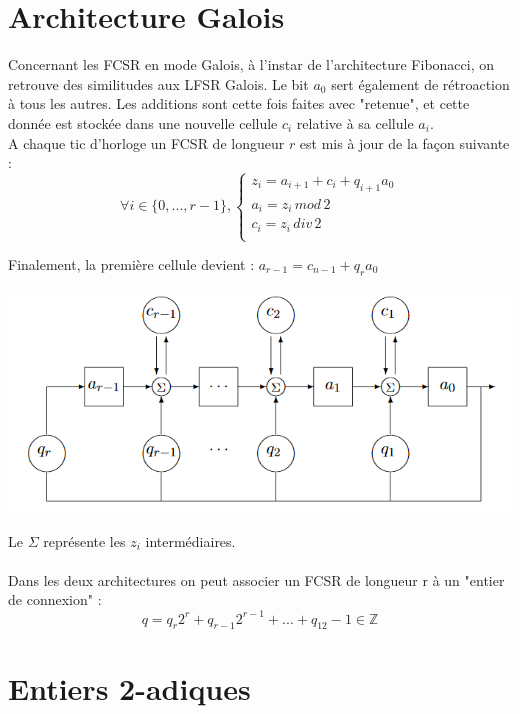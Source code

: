 \documentclass[11pt]{report}
\begin{document}
\section{Architecture Galois}
	
	Concernant les FCSR en mode Galois, à l'instar de l'architecture Fibonacci, on retrouve des similitudes aux LFSR Galois. Le bit $a_0$ sert également de rétroaction à tous les autres. Les additions sont cette fois faites avec "retenue", et cette donnée est stockée dans une nouvelle cellule $c_i$ relative à sa cellule $a_i$.
	\\
	A chaque tic d'horloge un FCSR de longueur $r$ est mis à jour de la façon suivante : 
	$$	
	\forall i \in \{0,...,r-1\},
	 \left\{
	 \begin{array}{ccc}
	 z_i = a_{i+1} + c_i + q_{i+1}a_0\\
	 a_i = z_i \, mod \,2\\
	 c_i = z_i \, div \,2\\
	 \end{array} 
	\right. 
	$$
	
	Finalement, la première cellule devient : $a_{r-1}=c_{n-1}+q_ra_0$
	
	\begin{center}
	
	\includegraphics[scale=0.7]{GaloisFCSR.png}
	\label{FCSRGalois}
	\end{center}
	
	Le $\Sigma$ représente les $z_i$ intermédiaires.
\\	
\\
	Dans les deux architectures on peut associer un FCSR de longueur r à un "entier de connexion" : 
	$$
	q = q_r2^r + q_{r-1}2^{r-1} + ... + q_12 - 1 \in 
	\mathbb{Z}
	$$
	\section{Entiers 2-adiques}
	
\end{document}
